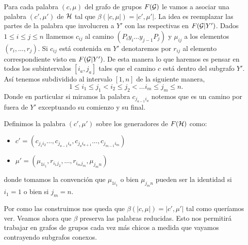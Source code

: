 \documentclass[tesis.tex]{subfiles}
\begin{document}
Para cada palabra $(c, \mu)$ del grafo de grupos $F({\cal G})$ le vamos a asociar una palabra $(c', \mu')$ de ${\cal H}$ tal que $\beta (|c,\mu|) = |c',\mu'|$.
La idea es reemplazar las partes de la palabra que involucren a $Y'$ con las respectivas en $F({\cal G} | Y')$.
Dados $ 1 \le i \le j \le n$ llamemos $c_{ij}$ al camino $(P_iy_i \dots y_{j-1}P_j)$ y $\mu_{ij}$ a los elementos $(r_i, \dots, r_j)$.
Si $c_{ij}$ está contenida en $Y'$ denotaremos por $r_{ij}$ al elemento correspondiente visto en $F({\cal G} | Y')$.
De esta manera lo que haremos es pensar en todos los subintervalos $[i_a,j_a]$ tales que el camino $c$ está dentro del subgrafo $Y'$.
Así tenemos subdividido al intervalo $[1,n]$ de la siguiente manera,
\[
	1\le i_1 \le j_1 < i_2 \le j_2 < \dots i_m \le j_m \le n.
\]
Donde en particular si miramos la palabra $c_{j_{a-1}i_a}$ notemos que es un camino por fuera de $Y'$ exceptuando su comienzo y su final.

Definimos la palabra $(c', \mu')$ sobre los generadores de $F({\cal H})$ como:
\begin{itemize}
	\item $c' = (c_{j_1i_2} \dots, c_{j_{a-1}i_a},c_{j_{a}i_{a+1}} \dots, c_{j_{m-1}i_{m}})$
	\item $\mu' = (\mu_{1i_1}, r_{i_1j_2}, \dots, r_{i_mj_m}, \mu_{j_m n}   )$
\end{itemize}
donde tomamos la convención que $\mu_{1i_1}$ o bien $\mu_{j_m n}$ pueden ser la identidad si $i_1=1$ o bien si $j_m = n$.




Por como las construimos nos queda que $\beta(|c,\mu|) = |c',\mu'|$ tal como queríamos ver.
Veamos ahora que $\beta$ preserva las palabras reducidas. 
Esto nos permitirá trabajar en grafos de grupos cada vez más chicos a medida que vayamos contrayendo subgrafos conexos.
\end{document}
